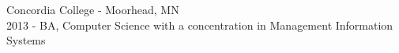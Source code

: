Concordia College - Moorhead, MN\\
2013 - BA, Computer Science with a concentration in Management Information Systems